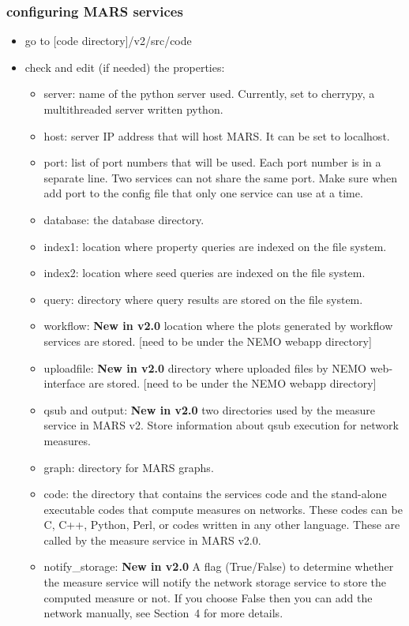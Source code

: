 \subsubsection{configuring MARS services}
\begin{itemize}
\item go to [code directory]/v2/src/code
\item check and edit (if needed) the properties:
\begin{itemize}
\item server: name of the python server used. Currently, set to cherrypy, a multithreaded server written python.
\item host: server IP address that will host MARS. It can be set to localhost. 
\item port: list of port numbers that will be used. Each port number is in a separate line. Two services can not share the same port. Make sure when add port to the config file that only one service can use at a time.
\item database: the database directory.
\item index1: location where property queries are indexed on the file system.
\item index2: location where seed queries are indexed on the file system.
\item query: directory where query results are stored on the file system.
\item workflow: \textbf{New in v2.0} location where the plots generated by workflow services are stored. [need to be under the NEMO webapp directory]
\item uploadfile: \textbf{New in v2.0} directory where uploaded files by NEMO web-interface are stored. [need to be under the NEMO webapp directory]
\item qsub and output: \textbf{New in v2.0} two directories used by the measure service in MARS v2. Store information about qsub execution for network measures.
\item graph: directory for MARS graphs.
\item code: the directory that contains the services code and the stand-alone executable codes that compute measures on networks.  These codes can be C, C++, Python, Perl, or codes written in any other language.  These are called by the measure service in MARS v2.0. 
\item notify\_storage: \textbf{New in v2.0} A flag (True/False) to determine whether the measure service will notify the network storage service to store the computed measure or not. If you choose False then you can add the network manually, see Section~4 for more details.

\end{itemize}
\end{itemize}


